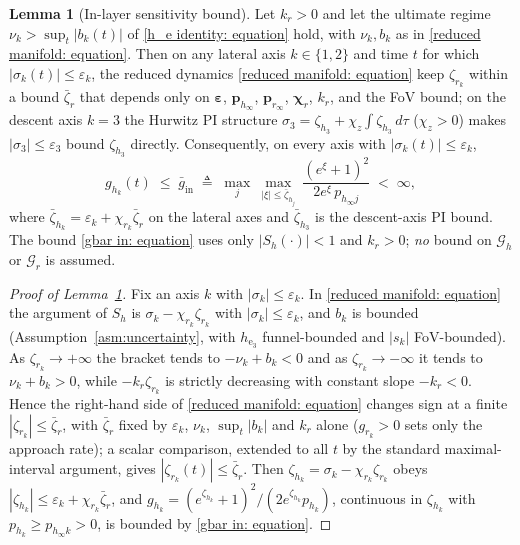 \documentclass{IEEEtaes}
\theoremstyle{definition}
\newtheorem{lemma}{Lemma}
\theoremstyle{remark}
\begin{document}
\begin{lemma}[In-layer sensitivity bound]\label{lem:inlayer}
Let $k_r>0$ and let the ultimate regime $\nu_k>\sup_t|b_k(t)|$ of \eqref{h_e identity: equation} hold, with $\nu_k,b_k$ as in \eqref{reduced manifold: equation}. Then on any lateral axis $k\in\{1,2\}$ and time $t$ for which $|\sigma_k(t)|\le\varepsilon_k$, the reduced dynamics \eqref{reduced manifold: equation} keep $\zeta_{r_k}$ within a bound $\bar{\zeta}_r$ that depends only on $\boldsymbol{\varepsilon}$, $\boldsymbol{p}_{h_\infty}$, $\boldsymbol{p}_{r_\infty}$, $\boldsymbol{\chi}_r$, $k_r$, and the FoV bound; on the descent axis $k=3$ the Hurwitz PI structure $\sigma_3=\zeta_{h_3}+\chi_z\!\int\zeta_{h_3}\,d\tau$ ($\chi_z>0$) makes $|\sigma_3|\le\varepsilon_3$ bound $\zeta_{h_3}$ directly. Consequently, on every axis with $|\sigma_k(t)|\le\varepsilon_k$,
\begin{equation} \label{gbar in: equation}
    g_{h_k}(t)\;\le\;\bar{g}_\text{in}\;\triangleq\;\max_{j}\ \max_{|\xi|\le\bar{\zeta}_{h_j}}\ \frac{(e^{\xi}+1)^2}{2e^{\xi}\,p_{h_\infty j}}\;<\;\infty ,
\end{equation}
where $\bar{\zeta}_{h_k}=\varepsilon_k+\chi_{r_k}\bar{\zeta}_r$ on the lateral axes and $\bar{\zeta}_{h_3}$ is the descent-axis PI bound. The bound \eqref{gbar in: equation} uses only $|S_h(\cdot)|<1$ and $k_r>0$; \emph{no} bound on $\mathcal{G}_h$ or $\mathcal{G}_r$ is assumed.
\end{lemma}
\begin{proof}[Proof of Lemma~\ref{lem:inlayer}] Fix an axis $k$ with $|\sigma_k|\le\varepsilon_k$. In \eqref{reduced manifold: equation} the argument of $S_h$ is $\sigma_k-\chi_{r_k}\zeta_{r_k}$ with $|\sigma_k|\le\varepsilon_k$, and $b_k$ is bounded (Assumption~\ref{asm:uncertainty}, with $h_{\text{e}_3}$ funnel-bounded and $|s_k|$ FoV-bounded). As $\zeta_{r_k}\to+\infty$ the bracket tends to $-\nu_k+b_k<0$ and as $\zeta_{r_k}\to-\infty$ it tends to $\nu_k+b_k>0$, while $-k_r\zeta_{r_k}$ is strictly decreasing with constant slope $-k_r<0$. Hence the right-hand side of \eqref{reduced manifold: equation} changes sign at a finite $|\zeta_{r_k}|\le\bar{\zeta}_r$, with $\bar{\zeta}_r$ fixed by $\varepsilon_k$, $\nu_k$, $\sup_t|b_k|$ and $k_r$ alone ($g_{r_k}>0$ sets only the approach rate); a scalar comparison, extended to all $t$ by the standard maximal-interval argument, gives $|\zeta_{r_k}(t)|\le\bar{\zeta}_r$. Then $\zeta_{h_k}=\sigma_k-\chi_{r_k}\zeta_{r_k}$ obeys $|\zeta_{h_k}|\le\varepsilon_k+\chi_{r_k}\bar{\zeta}_r$, and $g_{h_k}=(e^{\zeta_{h_k}}+1)^2/(2e^{\zeta_{h_k}}p_{h_k})$, continuous in $\zeta_{h_k}$ with $p_{h_k}\ge p_{h_\infty k}>0$, is bounded by \eqref{gbar in: equation}. \end{proof}
\end{document}
